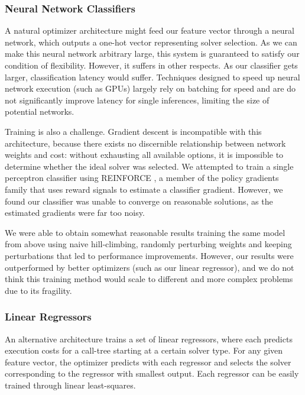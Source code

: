 \documentclass[11pt]{article}
\begin{document}
\subsubsection{Neural Network Classifiers}

A natural optimizer architecture might feed our feature vector through a neural network, which outputs a one-hot vector representing solver selection. As we can make this neural network arbitrary large, this system is guaranteed to satisfy our condition of flexibility. However, it suffers in other respects.  As our classifier gets larger, classification latency would suffer.  Techniques designed to speed up neural network execution (such as GPUs) largely rely on batching for speed and are do not significantly improve latency for single inferences, limiting the size of potential networks.

Training is also a challenge. Gradient descent is incompatible with this architecture, because there exists no discernible relationship between network weights and cost: without exhausting all available options, it is impossible to determine whether the ideal solver was selected.  We attempted to train a single perceptron classifier using REINFORCE \cite{reinforce}, a member of the policy gradients family that uses reward signals to estimate a classifier gradient.  However, we found our classifier was unable to converge on reasonable solutions, as the estimated gradients were far too noisy.

We were able to obtain somewhat reasonable results training the same model from above using naive hill-climbing, randomly perturbing weights and keeping perturbations that led to performance improvements.  However, our results were outperformed by better optimizers (such as our linear regressor), and we do not think this training method would scale to different and more complex problems due to its fragility.

\subsubsection{Linear Regressors}

An alternative architecture trains a set of linear regressors, where each predicts execution costs for a call-tree starting at a certain solver type.  For any given feature vector, the optimizer predicts with each regressor and selects the solver corresponding to the regressor with smallest output. Each regressor can be easily trained through linear least-squares.
\end{document}

